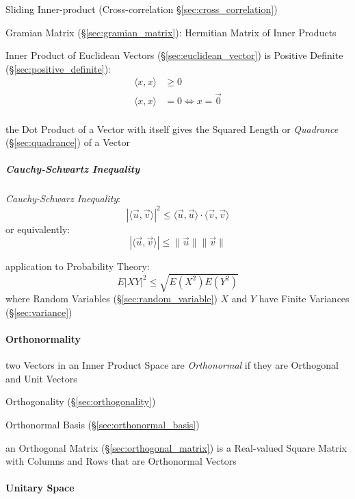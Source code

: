 \fist Sliding Inner-product (Cross-correlation \S\ref{sec:cross_correlation})

\fist Gramian Matrix (\S\ref{sec:gramian_matrix}): Hermitian Matrix of Inner
Products

Inner Product of Euclidean Vectors (\S\ref{sec:euclidean_vector}) is Positive
Definite (\S\ref{sec:positive_definite}):
\begin{align*}
  \langle{x,x}\rangle & \geq 0 \\
  \langle{x,x}\rangle & =    0 \Leftrightarrow x = \vec{0} \\
\end{align*}

the Dot Product of a Vector with itself gives the Squared Length or
\emph{Quadrance} (\S\ref{sec:quadrance}) of a Vector



\subparagraph{Cauchy-Schwartz Inequality}\label{sec:cauchy_schwarz}\hfill

\emph{Cauchy-Schwarz Inequality}:
\[
  |\langle{\vec{u},\vec{v}}\rangle|^2 \leq
    \langle{\vec{u},\vec{u}}\rangle \cdot \langle{\vec{v},\vec{v}}\rangle
\]
or equivalently:
\[
  |\langle{\vec{u},\vec{v}}\rangle| \leq \|\vec{u}\| \|\vec{v}\|
\]

application to Probability Theory:
\[
  E|XY|^2 \leq \sqrt{E(X^2)E(Y^2)}
\]
where Random Variables (\S\ref{sec:random_variable}) $X$ and $Y$ have Finite
Variances (\S\ref{sec:variance})



\paragraph{Orthonormality}\label{sec:orthonormality}\hfill

two Vectors in an Inner Product Space are \emph{Orthonormal} if they are
Orthogonal and Unit Vectors

\fist Orthogonality (\S\ref{sec:orthogonality})

\fist Orthonormal Basis (\S\ref{sec:orthonormal_basis})

an Orthogonal Matrix (\S\ref{sec:orthogonal_matrix}) is a Real-valued Square
Matrix with Columns and Rows that are Orthonormal Vectors



\paragraph{Unitary Space}\label{sec:unitary_space}\hfill

